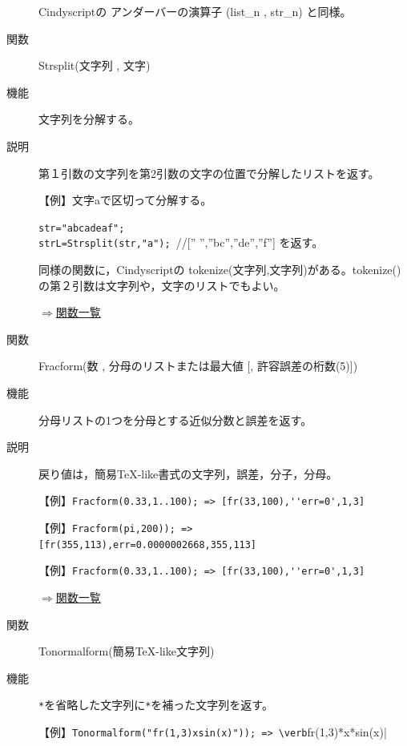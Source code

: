 \documentclass[papersize,a4paper,12pt,uplatex]{jsarticle}
\begin{document}
\begin{description}
Cindyscriptの アンダーバーの演算子 (list\_n , str\_n) と同様。

\vspace{\baselineskip}
\hypertarget{strsplit}{}
\item[関数]Strsplit(文字列 , 文字)
\item[機能]文字列を分解する。
\item[説明]第１引数の文字列を第2引数の文字の位置で分解したリストを返す。

\vspace{\baselineskip}
【例】文字aで区切って分解する。

\verb|str="abcadeaf";| \\
\verb|strL=Strsplit(str,"a"); |//[” ”,”bc”,”de”,”f”] を返す。

同様の関数に，Cindyscriptの tokenize(文字列,文字列)がある。tokenize() の第２引数は文字列や，文字のリストでもよい。

\begin{flushright}\hyperlink{functionlist}{$\Rightarrow$関数一覧}\end{flushright}

\vspace{\baselineskip}
\hypertarget{fracform}{}
\item[関数]Fracform(数 , 分母のリストまたは最大値 [, 許容誤差の桁数(5)])
\item[機能]分母リストの1つを分母とする近似分数と誤差を返す。
\item[説明]戻り値は，簡易TeX-like書式の文字列，誤差，分子，分母。

\vspace{\baselineskip}
【例】\verb|Fracform(0.33,1..100); => [fr(33,100),''err=0',1,3]|

【例】\verb|Fracform(pi,200)); => [fr(355,113),err=0.0000002668,355,113]|

【例】\verb|Fracform(0.33,1..100); => [fr(33,100),''err=0',1,3]|

\begin{flushright}\hyperlink{functionlist}{$\Rightarrow$関数一覧}\end{flushright}

\vspace{\baselineskip}
\hypertarget{tonormalform}{}
\item[関数]Tonormalform(簡易TeX-like文字列)
\item[機能]\verb|*|を省略した文字列に\verb|*|を補った文字列を返す。

\vspace{\baselineskip}
【例】\verb|Tonormalform("fr(1,3)xsin(x)")); => \verb|fr(1,3)*x*sin(x)|


\end{description}
\end{document}
